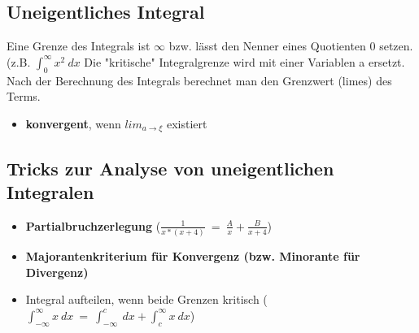 \documentclass[a4paper,12pt]{article} %
\begin{document}
\subsection{Uneigentliches Integral}
Eine Grenze des Integrals ist $\infty$ bzw. lässt den Nenner eines Quotienten 0 setzen. (z.B. $\int_{0}^{\infty} x^2 \ dx$
Die "kritische" Integralgrenze wird mit einer Variablen a ersetzt. Nach der Berechnung des Integrals berechnet man den Grenzwert (limes) des Terms.
\begin{itemize}
\item \textbf{konvergent}, wenn $lim_{a \rightarrow \xi}$ existiert
\end{itemize}
\subsection{Tricks zur Analyse von uneigentlichen Integralen}
\begin{itemize}
\item \textbf{Partialbruchzerlegung }($\frac{1}{x*(x+4)} \ = \ \frac{A}{x} + \frac{B}{x+4}$)
\item \textbf{Majorantenkriterium für Konvergenz (bzw. Minorante für Divergenz)}
\item Integral aufteilen, wenn beide Grenzen kritisch ($\int_{-\infty}^\infty x \ dx  \ = \ \int_{-\infty}^c \ dx + \int_{c}^\infty x \ dx$)
\end{itemize}
\end{document}
